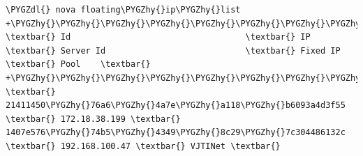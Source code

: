 \documentclass[letterpaper,10pt,english]{sphinxmanual}
\def\PYGZdl{\char`\$}
\def\PYGZhy{\char`\-}
\begin{document}
\begin{enumerate}
\begin{Verbatim}[commandchars=\\\{\}]
\PYGZdl{} nova floating\PYGZhy{}ip\PYGZhy{}list
+\PYGZhy{}\PYGZhy{}\PYGZhy{}\PYGZhy{}\PYGZhy{}\PYGZhy{}\PYGZhy{}\PYGZhy{}\PYGZhy{}\PYGZhy{}\PYGZhy{}\PYGZhy{}\PYGZhy{}\PYGZhy{}\PYGZhy{}\PYGZhy{}\PYGZhy{}\PYGZhy{}\PYGZhy{}\PYGZhy{}\PYGZhy{}\PYGZhy{}\PYGZhy{}\PYGZhy{}\PYGZhy{}\PYGZhy{}\PYGZhy{}\PYGZhy{}\PYGZhy{}\PYGZhy{}\PYGZhy{}\PYGZhy{}\PYGZhy{}\PYGZhy{}\PYGZhy{}\PYGZhy{}\PYGZhy{}\PYGZhy{}+\PYGZhy{}\PYGZhy{}\PYGZhy{}\PYGZhy{}\PYGZhy{}\PYGZhy{}\PYGZhy{}\PYGZhy{}\PYGZhy{}\PYGZhy{}\PYGZhy{}\PYGZhy{}\PYGZhy{}\PYGZhy{}\PYGZhy{}+\PYGZhy{}\PYGZhy{}\PYGZhy{}\PYGZhy{}\PYGZhy{}\PYGZhy{}\PYGZhy{}\PYGZhy{}\PYGZhy{}\PYGZhy{}\PYGZhy{}\PYGZhy{}\PYGZhy{}\PYGZhy{}\PYGZhy{}\PYGZhy{}\PYGZhy{}\PYGZhy{}\PYGZhy{}\PYGZhy{}\PYGZhy{}\PYGZhy{}\PYGZhy{}\PYGZhy{}\PYGZhy{}\PYGZhy{}\PYGZhy{}\PYGZhy{}\PYGZhy{}\PYGZhy{}\PYGZhy{}\PYGZhy{}\PYGZhy{}\PYGZhy{}\PYGZhy{}\PYGZhy{}\PYGZhy{}\PYGZhy{}+\PYGZhy{}\PYGZhy{}\PYGZhy{}\PYGZhy{}\PYGZhy{}\PYGZhy{}\PYGZhy{}\PYGZhy{}\PYGZhy{}\PYGZhy{}\PYGZhy{}\PYGZhy{}\PYGZhy{}\PYGZhy{}\PYGZhy{}\PYGZhy{}+\PYGZhy{}\PYGZhy{}\PYGZhy{}\PYGZhy{}\PYGZhy{}\PYGZhy{}\PYGZhy{}\PYGZhy{}\PYGZhy{}+
\textbar{} Id                                   \textbar{} IP            \textbar{} Server Id                            \textbar{} Fixed IP       \textbar{} Pool    \textbar{}
+\PYGZhy{}\PYGZhy{}\PYGZhy{}\PYGZhy{}\PYGZhy{}\PYGZhy{}\PYGZhy{}\PYGZhy{}\PYGZhy{}\PYGZhy{}\PYGZhy{}\PYGZhy{}\PYGZhy{}\PYGZhy{}\PYGZhy{}\PYGZhy{}\PYGZhy{}\PYGZhy{}\PYGZhy{}\PYGZhy{}\PYGZhy{}\PYGZhy{}\PYGZhy{}\PYGZhy{}\PYGZhy{}\PYGZhy{}\PYGZhy{}\PYGZhy{}\PYGZhy{}\PYGZhy{}\PYGZhy{}\PYGZhy{}\PYGZhy{}\PYGZhy{}\PYGZhy{}\PYGZhy{}\PYGZhy{}\PYGZhy{}+\PYGZhy{}\PYGZhy{}\PYGZhy{}\PYGZhy{}\PYGZhy{}\PYGZhy{}\PYGZhy{}\PYGZhy{}\PYGZhy{}\PYGZhy{}\PYGZhy{}\PYGZhy{}\PYGZhy{}\PYGZhy{}\PYGZhy{}+\PYGZhy{}\PYGZhy{}\PYGZhy{}\PYGZhy{}\PYGZhy{}\PYGZhy{}\PYGZhy{}\PYGZhy{}\PYGZhy{}\PYGZhy{}\PYGZhy{}\PYGZhy{}\PYGZhy{}\PYGZhy{}\PYGZhy{}\PYGZhy{}\PYGZhy{}\PYGZhy{}\PYGZhy{}\PYGZhy{}\PYGZhy{}\PYGZhy{}\PYGZhy{}\PYGZhy{}\PYGZhy{}\PYGZhy{}\PYGZhy{}\PYGZhy{}\PYGZhy{}\PYGZhy{}\PYGZhy{}\PYGZhy{}\PYGZhy{}\PYGZhy{}\PYGZhy{}\PYGZhy{}\PYGZhy{}\PYGZhy{}+\PYGZhy{}\PYGZhy{}\PYGZhy{}\PYGZhy{}\PYGZhy{}\PYGZhy{}\PYGZhy{}\PYGZhy{}\PYGZhy{}\PYGZhy{}\PYGZhy{}\PYGZhy{}\PYGZhy{}\PYGZhy{}\PYGZhy{}\PYGZhy{}+\PYGZhy{}\PYGZhy{}\PYGZhy{}\PYGZhy{}\PYGZhy{}\PYGZhy{}\PYGZhy{}\PYGZhy{}\PYGZhy{}+
\textbar{} 21411450\PYGZhy{}76a6\PYGZhy{}4a7e\PYGZhy{}a118\PYGZhy{}b6093a4d3f55 \textbar{} 172.18.38.199 \textbar{} 1407e576\PYGZhy{}74b5\PYGZhy{}4349\PYGZhy{}8c29\PYGZhy{}7c304486132c \textbar{} 192.168.100.47 \textbar{} VJTINet \textbar{}

\end{Verbatim}
\end{enumerate}
\end{document}
